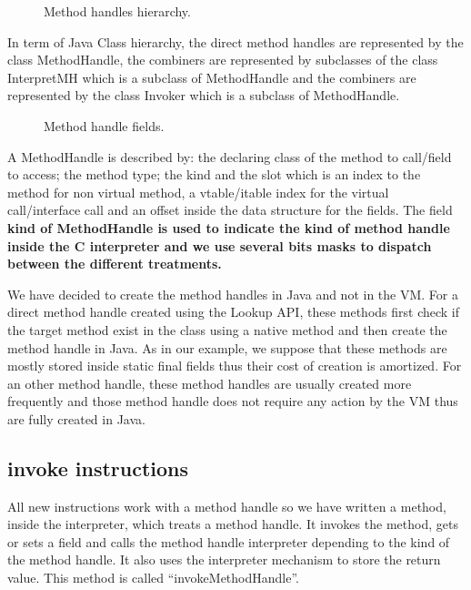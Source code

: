 \documentclass{sig-alternate}
\begin{document}
      \begin{figure}[!h]
        \centering \resizebox{\linewidth}{!}{}
        \caption{Method handles hierarchy.}
        \label{mhHier}
      \end{figure}

      In term of Java Class hierarchy, the direct method handles are represented by the class MethodHandle,
      the combiners are represented by subclasses of the class InterpretMH which is a subclass of MethodHandle
      and the combiners are represented by the class Invoker which is a subclass of MethodHandle.

      

      \begin{figure}[!h]
        \centering \vspace{-1.5em}
        \caption{Method handle fields.}
        \label{mhFields}
      \end{figure}

      A MethodHandle is described by: the declaring class of the method to call/field to access;
      the method type; the kind and the slot which is an index to the method for non virtual method,
      a vtable/itable index for the virtual call/interface call and an offset inside the data structure
      for the fields.
      The field \bf{kind} of MethodHandle is used to indicate the kind of method handle inside the C interpreter and we use
      several bits masks to dispatch between the different treatments.

      We have decided to create the method handles in Java and not in the VM.
      For a direct method handle created using the Lookup API, these methods first check
      if the target method exist in the class using a native method and then create
      the method handle in Java. As in our example, we suppose that these methods are
      mostly stored inside static final fields thus their cost of creation is amortized.
      For an other method handle, these method handles are usually created more frequently
      and those method handle does not require any action by the VM thus are fully created in Java.

    \subsection{invoke instructions}
      All new instructions work with a method handle so we have written a method, inside the interpreter, which treats a method handle.
      It invokes the method, gets or sets a field and calls the method handle interpreter depending to the kind of the method handle.
      It also uses the interpreter mechanism to store the return value.
      This method is called ``invokeMethodHandle''.
\end{document}
